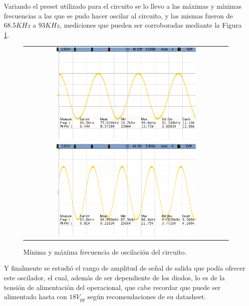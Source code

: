 Variando el preset utilizado para el circuito se lo llevo a las máximas y mínimas frecuencias a las que se pudo hacer oscilar al circuito, y las mismas fueron 
de $68.5KHz$ a $93KHz$, mediciones que pueden ser corroboradas mediante la Figura \ref{fig:min_max_freq_ex1}.
\begin{figure}[H]
    \centering
    \begin{tabular}{c}
        \includegraphics[width=0.7\textwidth]{../EJ1/Recursos/min_freq.png} \\
        \includegraphics[width=0.7\textwidth]{../EJ1/Recursos/max_freq.png}
    \end{tabular}
    \caption{Mínima y máxima frecuencia de oscilación del circuito.}
    \label{fig:min_max_freq_ex1}    
\end{figure}

Y finalmente se estudió el rango de amplitud de señal de salida que podía ofrecer este oscilador, el cual, además de ser dependiente de los diodos, lo es 
de la tensión de alimentación del operacional, que cabe recordar que puede ser alimentado hasta con $18V_{pp}$ según recomendaciones de su datasheet.

